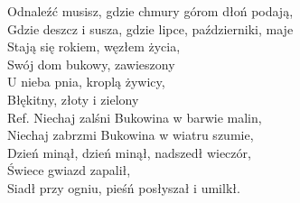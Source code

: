 \begin{flushleft}
\vskip 3mm
Odnaleźć musisz, gdzie chmury górom dłoń podają, \\
Gdzie deszcz i susza, gdzie lipce, październiki, maje \\
Stają się rokiem, węzłem życia, \\
Swój dom bukowy, zawieszony \\
U nieba pnia, kroplą żywicy, \\
Błękitny, złoty i zielony \\
\vskip 3mm
Ref. Niechaj zalśni Bukowina w barwie malin, \\
\hspace{0.9cm}Niechaj zabrzmi Bukowina w wiatru szumie, \\
\hspace{0.9cm}Dzień minął, dzień minął, nadszedł wieczór, \\
\hspace{0.9cm}Świece gwiazd zapalił, \\
\hspace{0.9cm}Siadł przy ogniu, pieśń posłyszał i umilkł. \\
\end{flushleft}
\clearpage

